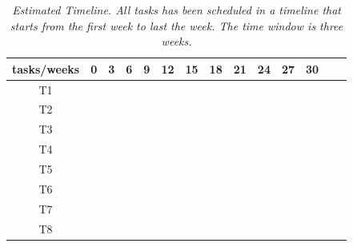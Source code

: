 \begin{table}[H]
\centering
\label{tab:340W}
\begin{tabular}{| c | c | c | c |c | c | c |c | c | c |c | c | c |c | }
\hline
tasks/weeks & 0 & 3 & 6 & 9 & 12 & 15 & 18 & 21 & 24 & 27 & 30 \\
\hline
T1  & \cellcolor{red!50} &   &   &   &   &   &   &   &   &   &     \\
\hline
T2  &   & \cellcolor{lime!50}  &  &  &   &   &   &    &  &  &   \\
\hline
T3  &  &  & \cellcolor{blue!40} &  &   &   &   &   &  &  & \\
\hline
T4  &  &  &  & \cellcolor{teal!50} & \cellcolor{teal!50} &  &  &   &   &   &   \\
\hline
T5  &  &  &  &  & \cellcolor{amber!30} & \cellcolor{amber!30} & \cellcolor{amber!30}  & \cellcolor{amber!30} & \cellcolor{amber!30}  &  & \\
\hline
T6  &  &  &  &  & \cellcolor{black!70} & \cellcolor{black!70} & \cellcolor{black!70}  & \cellcolor{black!70} & \cellcolor{black!70}  &  \cellcolor{black!70} & \\
\hline
T7  &   &  &  &  &  &  &  &   &    & \cellcolor{gray!50} & \\
\hline
T8  &   &  &  &  &  & \cellcolor{orange!50}  &  &   &   & \cellcolor{orange!50} & \cellcolor{orange!50} \\
\hline
\end{tabular}
\caption[Estimated Timeline.] {\textit{Estimated Timeline. All tasks has been scheduled in a timeline that starts from the first week to last the week. The time window is three weeks.}}
\end{table}
